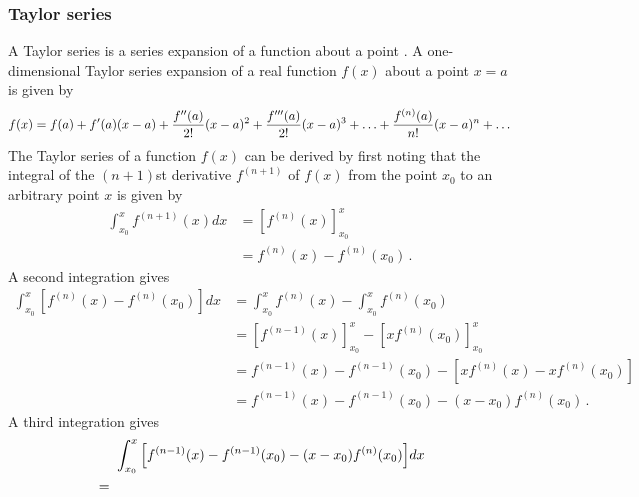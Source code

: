 \subsubsection{Taylor series}
A Taylor series is a series expansion of a function about a point \parencite{Weisstein2017}.  A one-dimensional Taylor series expansion of a real function $f(x)$ about a point $x = a$ is given by
\begin{equation*}
  \label{eq:tayse}
  f(x)=f(a)+f'(a)(x-a)+\frac{f''(a)}{2!}(x-a)^2+\frac{f'''(a)}{2!}(x-a)^3+\mathellipsis+\frac{f^{(n)}(a)}{n!}(x-a)^n+\mathellipsis
\end{equation*}
The Taylor series of a function $f(x)$ can be derived by first noting that the integral of the $(n+1)$st derivative $f^{(n+1)}$ of $f(x)$ from the point $x_0$ to an arbitrary point $x$ is given by
\begin{align*}
  \int_{x_0}^x{f^{(n+1)}(x)dx} &= \left[f^{(n)}(x)\right]_{x_0}^x \\
                               &= f^{(n)}(x) - f^{(n)}(x_0) \, .
\end{align*}
A second integration gives
\begin{align*}
  \int_{x_0}^x{\left[f^{(n)}(x) - f^{(n)}(x_0)\right]}dx &= \int_{x_0}^x{f^{(n)}(x)} - \int_{x_0}^x{f^{(n)}(x_0)} \\
                                                       &= \left[f^{(n-1)}(x)\right]_{x_0}^x - \left[x f^{(n)}(x_0)\right]_{x_0}^x \\
                                                       &= f^{(n-1)}(x) - f^{(n-1)}(x_0) - \left[x f^{(n)}(x) - x f^{(n)}(x_0)\right] \\
                                                       &= f^{(n-1)}(x) - f^{(n-1)}(x_0) - (x - x_0) f^{(n)}(x_0) \, .
\end{align*}
A third integration gives
\begin{align*}
  &\makebox[5mm]{}\int_{x_0}^x{\left[f^{(n-1)}(x) - f^{(n-1)}(x_0) - (x - x_0) f^{(n)}(x_0)\right]}dx \\
&= 
\end{align*}




